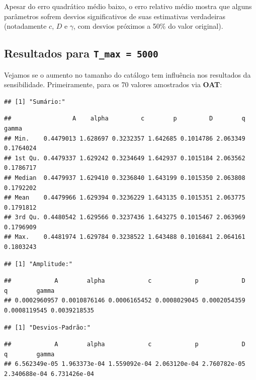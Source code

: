\documentclass[11pt,]{article}
\begin{document}
Apesar do erro quadrático médio baixo, o erro relativo médio mostra que
alguns parâmetros sofrem desvios significativos de suas estimativas
verdadeiras (notadamente \(c\), \(D\) e \(\gamma\), com desvios próximos
a 50\% do valor original).

\hypertarget{resultados-para-1}{%
\subsection{\texorpdfstring{Resultados para
\texttt{T_max = 5000}}{Resultados para }}\label{resultados-para-1}}

Vejamos se o aumento no tamanho do catálogo tem influência nos
resultados da sensibilidade. Primeiramente, para os 70 valores
amostrados via \textbf{OAT}:

\begin{verbatim}
## [1] "Sumário:"
\end{verbatim}

\begin{verbatim}
##                 A    alpha         c        p         D        q     gamma
## Min.    0.4479013 1.628697 0.3232357 1.642685 0.1014786 2.063349 0.1764024
## 1st Qu. 0.4479337 1.629242 0.3234649 1.642937 0.1015184 2.063562 0.1786717
## Median  0.4479937 1.629410 0.3236840 1.643199 0.1015350 2.063808 0.1792202
## Mean    0.4479966 1.629394 0.3236229 1.643135 0.1015351 2.063775 0.1791812
## 3rd Qu. 0.4480542 1.629566 0.3237436 1.643275 0.1015467 2.063969 0.1796909
## Max.    0.4481974 1.629784 0.3238522 1.643488 0.1016841 2.064161 0.1803243
\end{verbatim}

\begin{verbatim}
## [1] "Amplitude:"
\end{verbatim}

\begin{verbatim}
##            A        alpha            c            p            D            q        gamma 
## 0.0002960957 0.0010876146 0.0006165452 0.0008029045 0.0002054359 0.0008119545 0.0039218535
\end{verbatim}

\begin{verbatim}
## [1] "Desvios-Padrão:"
\end{verbatim}

\begin{verbatim}
##            A        alpha            c            p            D            q        gamma 
## 6.562349e-05 1.963373e-04 1.559092e-04 2.063120e-04 2.760782e-05 2.340688e-04 6.731426e-04
\end{verbatim}
\end{document}
